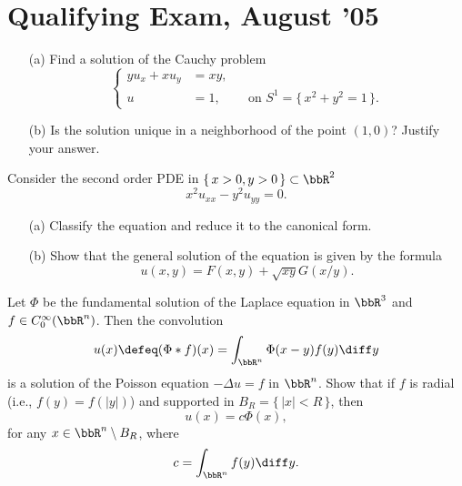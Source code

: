 \section{Qualifying Exam, August '05}
\begin{problem}
  \hfill
  \begin{itemize}[noitemsep]
  \item[(a)] Find a solution of the Cauchy problem
    \[
      \left\{
        \begin{aligned}
          yu_x+xu_y&=xy,\\
          u&=1,&&\text{on \(S^1=\bigl\{\,x^2+y^2=1\,\bigr\}\)}.
        \end{aligned}
      \right.
    \]
  \item[(b)] Is the solution unique in a neighborhood of the point
    \((1,0)\)? Justify your answer.
  \end{itemize}
\end{problem}
\begin{solution}
\end{solution}

\begin{problem}
  Consider the second order PDE in \(\{\,x>0,y>0\,\}\subset\bbR^2\)
  \[
    x^2u_{xx}-y^2u_{yy}=0.
  \]
  \begin{itemize}[noitemsep]
  \item[(a)] Classify the equation and reduce it to the canonical form.
  \item[(b)] Show that the general solution of the equation is given by the
    formula
    \[
      u(x,y)=F(x,y)+\sqrt{xy}G(x/y).
    \]
  \end{itemize}
\end{problem}
\begin{solution}
\end{solution}

\begin{problem}
  Let \(\Phi\) be the fundamental solution of the Laplace equation in
  \(\bbR^3\) and \(f\in C_0^\infty(\bbR^n)\). Then the convolution
  \[
    u(x)\defeq(\Phi*f)(x)=\int_{\bbR^n}\Phi(x-y)f(y)\diff y
  \]
  is a solution of the Poisson equation \(-\Delta u=f\) in \(\bbR^n\). Show
  that if \(f\) is radial (i.e., \(f(y)=f(|y|)\)) and supported in
  \(B_R=\{\,|x|<R\,\}\), then
  \[
    u(x)=c\Phi(x),
  \]
  for any \(x\in\bbR^n\setminus B_R\), where
  \[
    c=\int_{\bbR^n}f(y)\diff y.
  \]

\end{problem}
\begin{solution}
\end{solution}


